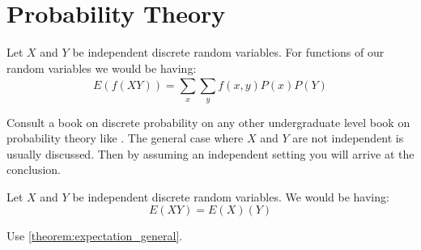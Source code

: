 \section{Probability Theory}
\begin{Thm}\label{theorem:expectation_general}
    Let $X$ and $Y$ be independent discrete random variables. For functions of our random variables we would be having:
	\begin{equation*}
		E(f(XY)) = \sum_{x}^{}\sum_{y}^{}f(x,y)P(x)P(Y)
	\end{equation*}
\end{Thm}
\begin{Proof}
    Consult a book on discrete probability on any other undergraduate level book on probability theory like \cite{DasGupta2011}.
    The general case where $X$ and $Y$ are not independent is usually discussed. Then by assuming an independent setting 
    you will arrive at the conclusion.
\end{Proof}
\begin{Cor}\label{theorem:expectation_multiplication}
	Let $X$ and $Y$ be independent discrete random variables. We would be having:
	\begin{equation*}
		E(XY) = E(X)(Y)
	\end{equation*}
\end{Cor}
\begin{Proof}
Use \cref{theorem:expectation_general}.
\end{Proof}






